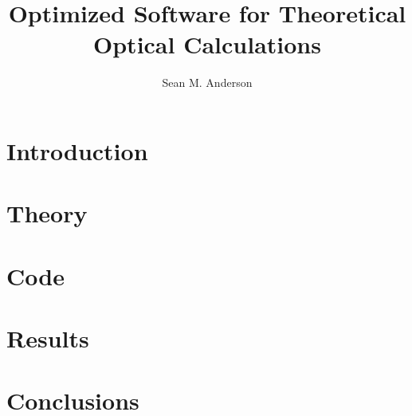 \documentclass{book}
\title{Optimized Software for Theoretical Optical Calculations}
\author{Sean M. Anderson}
\begin{document}
\frontmatter
\maketitle
\tableofcontents

\mainmatter
\chapter{Introduction}\label{ch:intro}

\chapter{Theory}\label{ch:theory}

\chapter{Code}\label{ch:code}

\chapter{Results}\label{ch:results}

\chapter{Conclusions}\label{ch:conc}


\appendix
% 
% 
% 
% 
% 
% 
% 
% 



\end{document}

